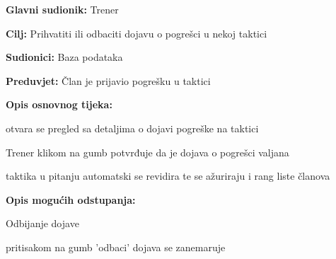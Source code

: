 					\noindent {}
					\begin{packed_item}
	
						\item \textbf{Glavni sudionik: }Trener
						\item  \textbf{Cilj: } Prihvatiti ili odbaciti dojavu o pogrešci u nekoj taktici
						\item  \textbf{Sudionici: } Baza podataka
						\item  \textbf{Preduvjet: } Član je prijavio pogrešku u taktici
						\item  \textbf{Opis osnovnog tijeka:}
						
						\item[] \begin{packed_enum}
	
							\item otvara se pregled sa detaljima o dojavi pogreške na taktici
							\item Trener klikom na gumb potvrđuje da je dojava o pogrešci valjana
							\item taktika u pitanju automatski se revidira te se ažuriraju i rang liste članova
							
						\end{packed_enum}
						
						\item  \textbf{Opis mogućih odstupanja:}
						
						\item[] \begin{packed_item}
	
							\item[2.a] Odbijanje dojave
							\item[] \begin{packed_enum}
								
								\item pritisakom na gumb 'odbaci' dojava se zanemaruje
								
							\end{packed_enum}
							
							
						\end{packed_item}
					\end{packed_item}
				
					\eject
					
